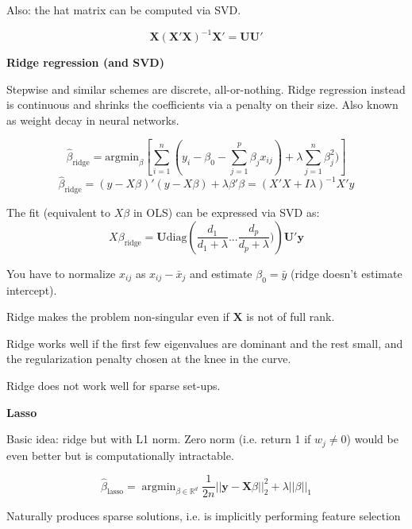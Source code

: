 \documentclass{minimal}
\DeclareMathOperator*{\argmin}{argmin}
\begin{document}
Also: the hat matrix can be computed via SVD.

$$
\mathbf{X}(\mathbf{X}'\mathbf{X})^{-1}\mathbf{X}' = \mathbf{UU}'
$$

\medskip
\textbf{Ridge regression (and SVD)}

Stepwise and similar schemes are discrete, all-or-nothing. Ridge regression instead is continuous and
shrinks the coefficients via a penalty on their size. Also known as weight decay in neural networks.

$$
\hat{\beta}_{\mathrm{ridge}} = \mathrm{argmin}_\beta \left [ \sum_{i=1}^n (y_i -
\beta_0 - \sum_{j=1}^p \beta_j x_{ij}) + \lambda \sum_{j=1}^n \beta^2_j) \right ]
$$
$$
\hat{\beta}_{\mathrm{ridge}} = (y-X\beta)'(y-X\beta) + \lambda \beta'\beta =
(X'X+I\lambda)^{-1}X'y
$$


The fit (equivalent to $X\beta$ in OLS) can be expressed via SVD as:
$$
X\beta_{\mathrm{ridge}} = \mathbf{U}
\mathrm{diag}\left (\frac{d_1}{d_1+\lambda}...\frac{d_p}{d_p + \lambda})\right )
\mathbf{U}'\mathbf{y}
$$

You have to normalize $x_{ij}$ as $x_{ij}-\bar{x}_j$ and estimate
$\beta_0=\bar{y}$ (ridge doesn't estimate intercept).


Ridge makes the problem non-singular even if $\mathbf{X}$ is not of full rank.

Ridge works well if the first few eigenvalues are dominant and the rest small,
and the regularization penalty chosen at the knee in the curve.

Ridge does not work well for sparse set-ups.

\medskip
\textbf{Lasso}

Basic idea: ridge but with L1 norm. Zero norm (i.e. return 1 if $w_j \neq 0$)
would be even better but is computationally intractable.

$$
\hat{\beta}_\mathrm{lasso} = \argmin_{\beta \in \mathbb{R}^d}
\frac{1}{2n}||\mathbf{y} - \mathbf{X}\beta||^2_2 + \lambda||\beta||_1
$$

Naturally produces sparse solutions, i.e. is implicitly performing feature
selection
\end{document}
